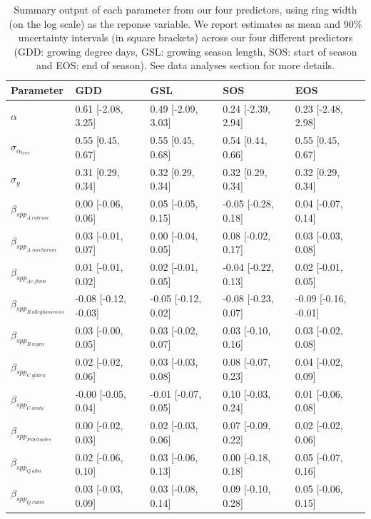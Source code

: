 \documentclass{article}\usepackage[]{graphicx}\usepackage[]{xcolor}
\begin{document}
\begin{table}[ht]
\centering
\caption{Summary output of each parameter from our four predictors, using ring width (on the log scale) as the reponse variable. We report estimates as mean and 90\% uncertainty intervals (in square brackets) across our four different predictors (GDD: growing degree days, GSL: growing season length, SOS: start of season and EOS: end of season). See data analyses section for more details.} 
\label{tab:tab_all}
\begin{tabular}{lllll}
  \hline
Parameter & GDD & GSL & SOS & EOS \\ 
  \hline
$\alpha$ & 0.61 [-2.08, 3.25] & 0.49 [-2.09, 3.03] & 0.24 [-2.39, 2.94] & 0.23 [-2.48, 2.98] \\ 
  $\sigma_{\alpha_{tree}}$ & 0.55 [0.45, 0.67] & 0.55 [0.45, 0.68] & 0.54 [0.44, 0.66] & 0.55 [0.45, 0.67] \\ 
  $\sigma_{y}$ & 0.31 [0.29, 0.34] & 0.32 [0.29, 0.34] & 0.32 [0.29, 0.34] & 0.32 [0.29, 0.34] \\ 
  $\beta_{spp_{A. rubrum}}$ & 0.00 [-0.06, 0.06] & 0.05 [-0.05, 0.15] & -0.05 [-0.28, 0.18] & 0.04 [-0.07, 0.14] \\ 
  $\beta_{spp_{A. saccharum}}$ & 0.03 [-0.01, 0.07] & 0.00 [-0.04, 0.05] & 0.08 [-0.02, 0.17] & 0.03 [-0.03, 0.08] \\ 
  $\beta_{spp_{Ae. flava}}$ & 0.01 [-0.01, 0.02] & 0.02 [-0.01, 0.05] & -0.04 [-0.22, 0.13] & 0.02 [-0.01, 0.05] \\ 
  $\beta_{spp_{B. alleghaniensis}}$ & -0.08 [-0.12, -0.03] & -0.05 [-0.12, 0.02] & -0.08 [-0.23, 0.07] & -0.09 [-0.16, -0.01] \\ 
  $\beta_{spp_{B. nigra}}$ & 0.03 [-0.00, 0.05] & 0.03 [-0.02, 0.07] & 0.03 [-0.10, 0.16] & 0.03 [-0.02, 0.08] \\ 
  $\beta_{spp_{C. glabra}}$ & 0.02 [-0.02, 0.06] & 0.03 [-0.03, 0.08] & 0.08 [-0.07, 0.23] & 0.04 [-0.02, 0.09] \\ 
  $\beta_{spp_{C. ovata}}$ & -0.00 [-0.05, 0.04] & -0.01 [-0.07, 0.05] & 0.10 [-0.03, 0.24] & 0.01 [-0.06, 0.08] \\ 
  $\beta_{spp_{P. deltoides}}$ & 0.00 [-0.02, 0.03] & 0.02 [-0.03, 0.06] & 0.07 [-0.09, 0.22] & 0.02 [-0.02, 0.06] \\ 
  $\beta_{spp_{Q. alba}}$ & 0.02 [-0.06, 0.10] & 0.03 [-0.06, 0.13] & 0.00 [-0.18, 0.18] & 0.05 [-0.07, 0.16] \\ 
  $\beta_{spp_{Q. rubra}}$ & 0.03 [-0.03, 0.09] & 0.03 [-0.08, 0.14] & 0.09 [-0.10, 0.28] & 0.05 [-0.06, 0.15] \\ 

\end{tabular}
\end{table}
\end{document}
